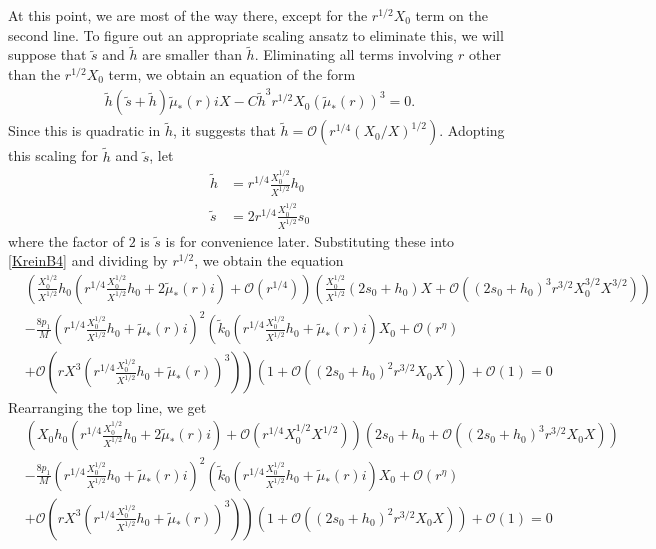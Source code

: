 \documentclass[thesis.tex]{subfiles}
\begin{document}
At this point, we are most of the way there, except for the $r^{1/2}X_0$ term on the second line. To figure out an appropriate scaling ansatz to eliminate this, we will suppose that $\tilde{s}$ and $\tilde{h}$ are smaller than $\tilde{h}$. Eliminating all terms involving $r$ other than the $r^{1/2}X_0$ term, we obtain an equation of the form
\begin{equation*}
\begin{aligned}
\tilde{h} (\tilde{s} + \tilde{h}) \tilde{\mu}_*(r) i X
- C \tilde{h}^3 r^{1/2} X_0 (\tilde{\mu}_*(r))^3 = 0.
\end{aligned}
\end{equation*} 
Since this is quadratic in $\tilde{h}$, it suggests that $\tilde{h} = \mathcal{O}(r^{1/4}(X_0/X)^{1/2})$. Adopting this scaling for $\tilde{h}$ and $\tilde{s}$, let
\begin{align*}
\tilde{h} &= r^{1/4}\frac{X_0^{1/2}}{X^{1/2}} h_0 \\
\tilde{s} &= 2 r^{1/4}\frac{X_0^{1/2}}{X^{1/2}} s_0
\end{align*}
where the factor of $2$ is $\tilde{s}$ is for convenience later. Substituting these into \cref{KreinB4} and dividing by $r^{1/2}$, we obtain the equation
\begin{equation}\label{KreinB5}
\begin{aligned}
&\left( \frac{X_0^{1/2}}{X^{1/2}} h_0 \left( r^{1/4}\frac{X_0^{1/2}}{X^{1/2}} h_0 + 2 \tilde{\mu}_*(r) i\right) + \mathcal{O}( r^{1/4} ) \right) 
\left( \frac{X_0^{1/2}}{X^{1/2}}(2 s_0 + h_0) X + \mathcal{O}\left( \left( 2 s_0 + h_0 \right)^3 r^{3/2} X_0^{3/2} X^{3/2} \right) \right) \\
&-\frac{8 p_1}{M} \left( r^{1/4}\frac{X_0^{1/2}}{X^{1/2}} h_0 + \tilde{\mu}_*(r) i\right)^2 \left( \tilde{k}_0 \left(r^{1/4}\frac{X_0^{1/2}}{X^{1/2}} h_0 + \tilde{\mu}_*(r)i \right) X_0 + \mathcal{O}(r^{\eta}) \right.\\
&+ \left. \mathcal{O} \left (r X^3 \left(r^{1/4} \frac{X_0^{1/2}}{X^{1/2}} h_0 + \tilde{\mu}_*(r)\right)^3 \right) \right) \left( 1 + \mathcal{O}\left( \left(2 s_0 + h_0\right)^2 r^{3/2} X_0 X \right) \right) + \mathcal{O}(1) = 0
\end{aligned}
\end{equation}
Rearranging the top line, we get
\begin{equation*}
\begin{aligned}
&\left( X_0 h_0 \left( r^{1/4}\frac{X_0^{1/2}}{X^{1/2}} h_0 + 2 \tilde{\mu}_*(r) i\right) + \mathcal{O}\left( r^{1/4} X_0^{1/2} X^{1/2} \right) \right) 
\left( 2 s_0 + h_0 + \mathcal{O}\left( \left( 2 s_0 + h_0 \right)^3 r^{3/2} X_0 X \right) \right) \\
&-\frac{8 p_1}{M} \left( r^{1/4}\frac{X_0^{1/2}}{X^{1/2}} h_0 + \tilde{\mu}_*(r) i\right)^2 \left( \tilde{k}_0 \left(r^{1/4}\frac{X_0^{1/2}}{X^{1/2}} h_0 + \tilde{\mu}_*(r)i \right) X_0 + \mathcal{O}(r^{\eta}) \right.\\
&+ \left. \mathcal{O} \left (r X^3 \left(r^{1/4} \frac{X_0^{1/2}}{X^{1/2}} h_0 + \tilde{\mu}_*(r)\right)^3 \right) \right) \left( 1 + \mathcal{O}\left( \left(2 s_0 + h_0\right)^2 r^{3/2} X_0 X \right) \right) + \mathcal{O}(1) = 0
\end{aligned}
\end{equation*}
\end{document}
